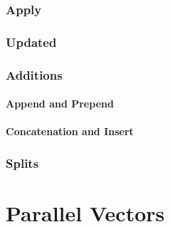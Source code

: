 
\subsubsection{Apply}




\subsubsection{Updated}



\subsubsection{Additions}

\paragraph{Append and Prepend}

\paragraph{Concatenation and Insert}



\subsubsection{Splits}



\section{Parallel Vectors}

